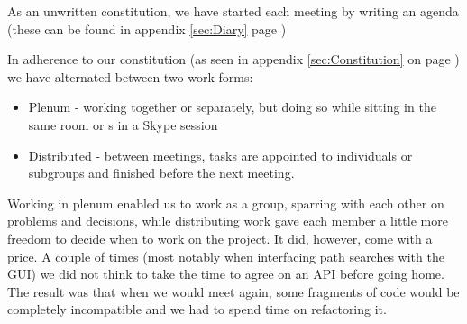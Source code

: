 As an unwritten constitution, we have started each meeting by writing an agenda (these can be found in appendix \ref{sec:Diary} page \pageref{sec:Diary})

In adherence to our constitution (as seen in appendix \ref{sec:Constitution} on page \pageref{sec:Constitution})
we have alternated between two work forms: 
\begin{itemize}
	\item Plenum - working together or separately, but doing so while sitting in the same room or s in a Skype session
	\item Distributed - between meetings, tasks are appointed to individuals or subgroups and finished before the next meeting.
\end{itemize}
Working in plenum enabled us to work as a group, sparring with each other on problems and decisions, while distributing work gave each member a little more freedom to decide when to work on the project.
It did, however, come with a price. A couple of times (most notably when interfacing path searches with the GUI) we did not think to take the time to agree on an API before going home. The result was that when we would meet again, some fragments of code would be completely incompatible and we had to spend time on refactoring it.
